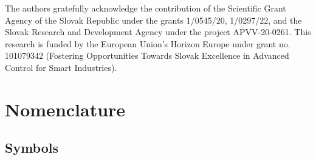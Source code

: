 \documentclass[preprint,12pt]{elsarticle}
\begin{document}
	The authors gratefully acknowledge the contribution of the Scientific Grant Agency of the Slovak Republic under the grants 1/0545/20, 1/0297/22, and the Slovak Research and Development Agency under the project APVV-20-0261. 
	This research is funded by the European Union’s Horizon Europe under grant no. 101079342 (Fostering Opportunities Towards Slovak Excellence in Advanced Control for Smart Industries). 
	
	\section*{Nomenclature}
	
	\subsection*{Symbols}
\end{document}
